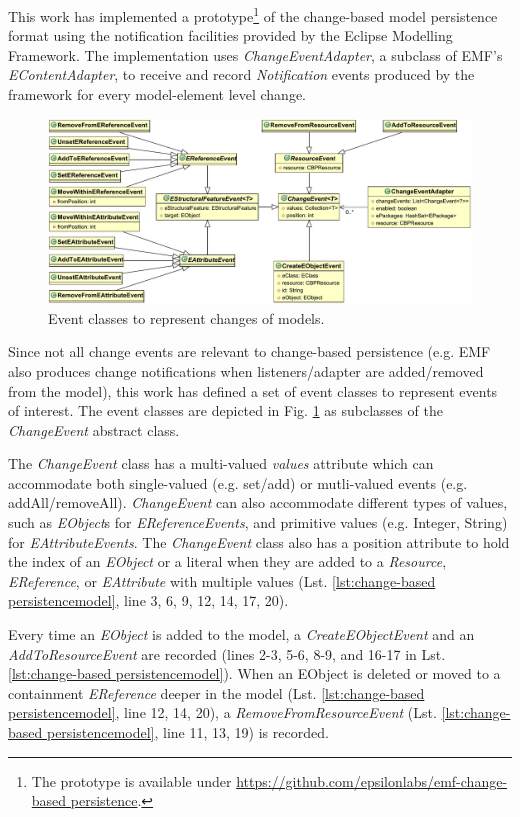 \documentclass[12pt, a4paper]{report} \usepackage[titletoc]{appendix}
\begin{document}
This work has implemented a prototype\footnote{The prototype is available under \url{https://github.com/epsilonlabs/emf-change-based persistence}.} of the change-based model persistence format using the notification facilities provided by the Eclipse Modelling Framework. The implementation uses \emph{ChangeEventAdapter}, a subclass of EMF's \emph{EContentAdapter}, to receive and record \emph{Notification} events produced by the framework for every model-element level change.

\begin{figure}[th]
	\centering
	\includegraphics[width=\linewidth]{events}
	\caption{Event classes to represent changes of models.}
	\label{fig:events}
\end{figure}

Since not all change events are relevant to change-based persistence (e.g. EMF also produces change notifications when listeners/adapter are added/removed from the model), this work has defined a set of event classes to represent events of interest. The event classes are depicted in Fig. \ref{fig:events} as subclasses of the \emph{ChangeEvent} abstract class. 

The \emph{ChangeEvent} class has a multi-valued \emph{values} attribute which can accommodate both single-valued (e.g. set/add) or mutli-valued events (e.g. addAll/removeAll). \emph{ChangeEvent} can also accommodate different types of values, such as \emph{EObject}s for \emph{EReferenceEvents}, and primitive values (e.g. Integer, String) for \emph{EAttributeEvents}. The \emph{ChangeEvent} class also has a position attribute to hold the index of an \emph{EObject} or a literal when they are added to a \emph{Resource}, \emph{EReference}, or \emph{EAttribute} with multiple values (Lst. \ref{lst:change-based persistencemodel}, line 3, 6, 9, 12, 14, 17, 20). 

Every time an \emph{EObject} is added to the model, a \emph{CreateEObjectEvent} and an \emph{AddToResourceEvent} are recorded (lines 2-3, 5-6, 8-9, and 16-17 in Lst. \ref{lst:change-based persistencemodel}). When an EObject is deleted or moved to a containment \emph{EReference} deeper in the model (Lst. \ref{lst:change-based persistencemodel}, line 12, 14, 20), a \emph{RemoveFromResourceEvent} (Lst. \ref{lst:change-based persistencemodel}, line 11, 13, 19) is recorded.
\end{document}
